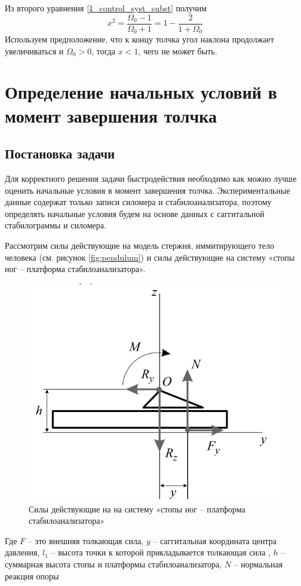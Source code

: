 \documentclass[a4paper,12pt, openany]{book}
\theoremstyle{plain} %
\theoremstyle{definition} %
\theoremstyle{remark} %
\numberwithin{equation}{chapter}
\begin{document}
{Из второго уравнения \eqref{1_control_syst_subst} получим
$$x^2=\dfrac{\Omega_0-1}{\Omega_0+1}=1-\dfrac{2}{1+\Omega_0}$$
Используем предположение, что к концу толчка угол наклона продолжает увеличиваться и $\Omega_0>0$,
тогда $x<1$, чего не может быть.
\chapter{Определение начальных условий в момент завершения толчка}
\section{Постановка задачи}
Для корректного решения задачи быстродействия необходимо как можно лучше оценить
начальные условия в момент завершения толчка. Экспериментальные данные содержат только записи силомера
и стабилоанализатора, поэтому определять начальные условия будем на основе данных с саггитальной стабилограммы и силомера.

Рассмотрим силы действующие на модель стержня, иммитирующего тело человека (см. рисунок \ref{fig:pendulum})
и силы действующие на систему «стопы ног – платформа стабилоанализатора».
\begin{figure}[h!]
    \centering
    \includegraphics[width=0.5\linewidth]{foot.png}
    \caption{Силы действующие на на систему «стопы ног – платформа стабилоанализатора» }
    \label{fig:foot-platform}
\end{figure}

Где $F$ – это внешняя толкающая сила, $y$ – саггитальная координата центра давления, $l_1$ – высота точки к которой прикладывается толкающая сила
, $h$ – суммарная высота стопы и платформы стабилоанализатора, $N$ – нормальная реакция опоры

}
\end{document}
